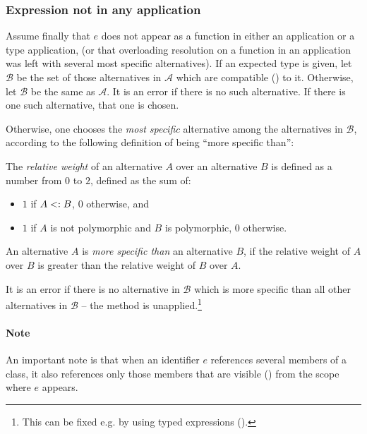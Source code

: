 \subsubsection{Expression not in any application}
\label{sec:overloading-resolution-no-app}

Assume finally that $e$ does not appear as a function in either an application or a type application, (or that overloading resolution on a function in an application was left with several most specific alternatives). If an expected type is given, let $\mathcal{B}$ be the set of those alternatives in $\mathcal{A}$ which are compatible () to it. Otherwise, let $\mathcal{B}$ be the same as $\mathcal{A}$. It is an error if there is no such alternative. If there is one such alternative, that one is chosen. 

Otherwise, one chooses the {\em most specific} alternative among the alternatives in $\mathcal{B}$, according to the following definition of being ``more specific than'':

\begin{definition}
The {\em relative weight} of an alternative $A$ over an alternative $B$ is defined as a number from $0$ to $2$, defined as the sum of:
\begin{itemize}
  \item $1$ if $A <: B$, $0$ otherwise, and
  \item $1$ if $A$ is not polymorphic and $B$ is polymorphic, $0$ otherwise.
\end{itemize}
\end{definition}

An alternative $A$ is {\em more specific than} an alternative $B$, if the relative weight of $A$ over $B$ is greater than the relative weight of $B$ over $A$. 

It is an error if there is no alternative in $\mathcal{B}$ which is more specific than all other alternatives in $\mathcal{B}$ -- the method is unapplied.\footnote{This can be fixed e.g. by using typed expressions ().}

\paragraph{Note}
An important note is that when an identifier $e$ references several members of a class, it also references only those members that are visible () from the scope where $e$ appears. 

